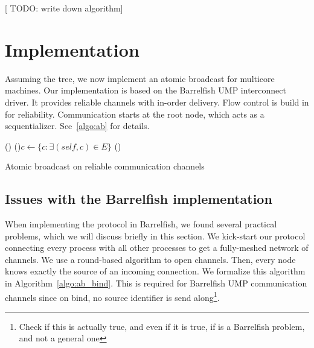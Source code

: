\documentclass{article}
\newcommand{\stefan}[1]{
  {\color{skRed}[{\color{red}{SK}} #1]}}
\begin{document}
\stefan{TODO: write down algorithm}

\section{Implementation}

Assuming the tree, we now implement an atomic broadcast for multicore
machines. Our implementation is based on the Barrelfish UMP
interconnect driver. It provides reliable channels with in-order
delivery. Flow control is build in for reliability. Communication
starts at the root node, which acts as a
sequentializer. See~\ref{algo:ab} for details.

\begin{algorithm}[htb]
%
%
%
%
%
%
%
  \BlankLine
  \Fn(){}{
    \For(){$c \leftarrow \{ c: \exists (self, c) \in E \} $}{
    }
    \waitchild{}\;
    \;
  }
  \BlankLine
  \Fn(){}{
  }
  \caption{Atomic broadcast on reliable communication channels}
  \label{algo:ab}

\end{algorithm}

\subsection{Issues with the Barrelfish implementation}

When implementing the protocol in Barrelfish, we found several
practical problems, which we will discuss briefly in this section.
We kick-start our protocol connecting every process with all other
processes to get a fully-meshed network of channels.
We use a round-based algorithm to open channels. Then, every node
knows exactly the source of an incoming connection. We formalize this
algorithm in Algorithm~\ref{algo:ab_bind}.
This is required for Barrelfish UMP communication channels since on
bind, no source identifier is send along\footnote{Check if this is
  actually true, and even if it is true, if is a Barrelfish problem,
  and not a general one}.
\end{document}
